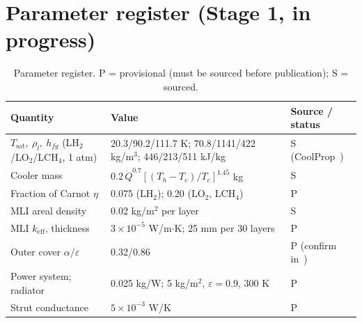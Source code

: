 \documentclass[11pt]{article}
\newcommand{\Qd}{\dot Q}
\begin{document}
\section{Parameter register (Stage 1, in progress)}
\begin{table}[!htb]
\centering\small
\caption{Parameter register. P = provisional (must be sourced before publication); S = sourced.}
\label{tab:params}
\begin{tabular}{@{}p{5.1cm}p{5.6cm}p{4.3cm}@{}}
\toprule
Quantity & Value & Source / status\\
\midrule
$T_\text{sat},\ \rho_l,\ h_{fg}$ (LH$_2$/LO$_2$/LCH$_4$, 1 atm) & 20.3/90.2/111.7 K; 70.8/1141/422 kg/m$^3$; 446/213/511 kJ/kg & S (CoolProp~\cite{coolprop})\\
Cooler mass & $0.2\,\Qd^{0.7}[(T_h-T_c)/T_c]^{1.45}$ kg & S~\cite{plachta2003}\\
Fraction of Carnot $\eta$ & 0.075 (LH$_2$); 0.20 (LO$_2$, LCH$_4$) & P\\
MLI areal density & 0.02 kg/m$^2$ per layer & S~\cite{plachta2003}\\
MLI $k_\text{eff}$, thickness & $3\times10^{-5}$ W/m$\cdot$K; 25 mm per 30 layers & P\\
Outer cover $\alpha/\varepsilon$ & 0.32/0.86 & P (confirm in~\cite{gilmore})\\
Power system; radiator & 0.025 kg/W; 5 kg/m$^2$, $\varepsilon=0.9$, 300 K & P\\
Strut conductance & $5\times10^{-3}$ W/K & P\\
\bottomrule
\end{tabular}
\end{table}

\end{document}
